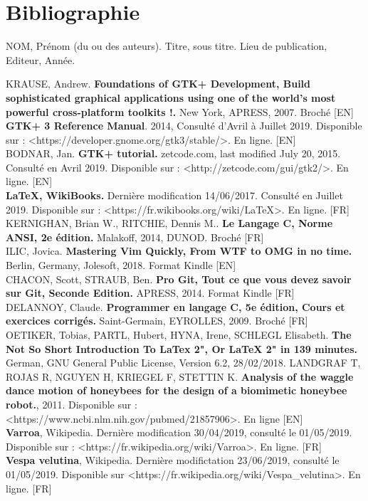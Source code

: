 \documentclass[11pt,french,a4paper]{report}
\begin{document}
\chapter{Bibliographie}

NOM, Prénom (du ou des auteurs). Titre, sous titre. Lieu de publication, Editeur, Année. 

KRAUSE, Andrew. \textbf{Foundations of GTK+ Development, Build sophisticated graphical applications using one of the world's most powerful cross-platform toolkits !.} New York, APRESS, 2007. Broché [EN] \\
\textbf{GTK+ 3 Reference Manual}. 2014, Consulté d'Avril à Juillet 2019. Disponible sur : <https://developer.gnome.org/gtk3/stable/>. En ligne. [EN] \\
BODNAR, Jan. \textbf{GTK+ tutorial.} zetcode.com, last modified July 20, 2015. Consulté en Avril 2019. Disponible sur : <http://zetcode.com/gui/gtk2/>. En ligne. [EN] \\
\textbf{LaTeX, WikiBooks.} Dernière modification 14/06/2017. Consulté en Juillet 2019. Disponible sur : <https://fr.wikibooks.org/wiki/LaTeX>. En ligne. [FR] \\
KERNIGHAN, Brian W., RITCHIE, Dennis M.. \textbf{Le Langage C, Norme ANSI, 2e édition.} Malakoff, 2014, DUNOD. Broché [FR] \\
ILIC, Jovica. \textbf{Mastering Vim Quickly, From WTF to OMG in no time.} Berlin, Germany, Jolesoft, 2018. Format Kindle [EN] \\
CHACON, Scott, STRAUB, Ben. \textbf{Pro Git, Tout ce que vous devez savoir sur Git, Seconde Edition.} APRESS, 2014. Format Kindle [FR] \\
DELANNOY, Claude. \textbf{Programmer en langage C, 5e édition, Cours et exercices corrigés.} Saint-Germain, EYROLLES, 2009. Broché [FR] \\
OETIKER, Tobias, PARTL, Hubert, HYNA, Irene, SCHLEGL Elisabeth. \textbf{The Not So Short Introduction To LaTex 2", Or LaTeX 2" in 139 minutes.} German, GNU General Public License, Version 6.2, 28/02/2018.
LANDGRAF T, ROJAS R, NGUYEN H, KRIEGEL F, STETTIN K. \textbf{Analysis of the waggle dance motion of honeybees for the design of a biomimetic honeybee robot.}, 2011. Disponible sur : <https://www.ncbi.nlm.nih.gov/pubmed/21857906>. En ligne [EN] \\
\textbf{Varroa}, Wikipedia. Dernière modification 30/04/2019, consulté le 01/05/2019. Disponible sur : <https://fr.wikipedia.org/wiki/Varroa>. En ligne. [FR]\\
\textbf{Vespa velutina}, Wikipedia. Dernière modifictation 23/06/2019, consulté le 01/05/2019. Disponible sur <https://fr.wikipedia.org/wiki/Vespa\_velutina>. En ligne. [FR] \\
\end{document}
